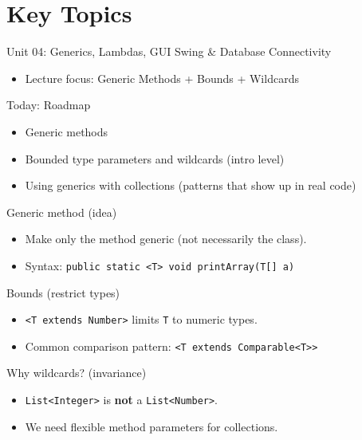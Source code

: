 \documentclass{beamer}
\begin{document}
\section{Key Topics}
\label{sec:concepts}

\begin{frame}{Unit 04: Generics, Lambdas, GUI Swing \& Database Connectivity}
  \begin{itemize}[<+->]
    \item Lecture focus: Generic Methods + Bounds + Wildcards
  \end{itemize}
  \slidesources{\OOPSUnitIVSources}
\end{frame}

\begin{frame}{Today: Roadmap}
  \begin{itemize}[<+->]
    \item Generic methods
    \item Bounded type parameters and wildcards (intro level)
    \item Using generics with collections (patterns that show up in real code)
  \end{itemize}
  \slidesources{\OOPSUnitIVSources}
\end{frame}

\begin{frame}{Generic method (idea)}
  \begin{itemize}[<+->]
    \item Make only the method generic (not necessarily the class).
    \item Syntax: \texttt{public static <T> void printArray(T[] a)}
  \end{itemize}
  \slidesources{\OOPSUnitIVSources}
\end{frame}

\begin{frame}{Bounds (restrict types)}
  \begin{itemize}[<+->]
    \item \texttt{<T extends Number>} limits \texttt{T} to numeric types.
    \item Common comparison pattern: \texttt{<T extends Comparable<T>>}
  \end{itemize}
  \slidesources{\OOPSUnitIVSources}
\end{frame}

\begin{frame}{Why wildcards? (invariance)}
  \begin{itemize}[<+->]
    \item \texttt{List<Integer>} is \textbf{not} a \texttt{List<Number>}.
    \item We need flexible method parameters for collections.
  \end{itemize}
  \slidesources{\OOPSUnitIVSources}
\end{frame}
\end{document}
